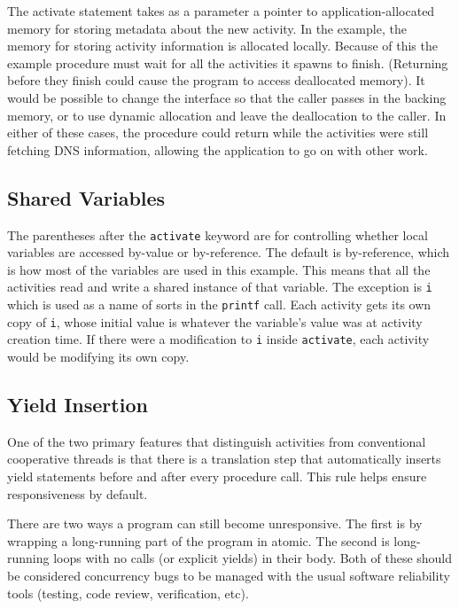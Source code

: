 \documentclass[sigplan,10pt,review,anonymous]{acmart}\settopmatter{printfolios=true,printccs=false,printacmref=false}
\begin{document}
The activate statement takes as a parameter a pointer to application-allocated memory for storing metadata about the new activity.
In the example, the memory for storing activity information is allocated locally.
Because of this the example procedure must wait for all the activities it spawns to finish.
(Returning before they finish could cause the program to access deallocated memory).
It would be possible to change the interface so that the caller passes in the backing memory, or to use dynamic allocation and leave the deallocation to the caller.
In either of these cases, the procedure could return while the activities were still fetching DNS information, allowing the application to go on with other work.

\subsection{Shared Variables}

The parentheses after the \texttt{activate} keyword are for controlling whether local variables are accessed by-value or by-reference.
The default is by-reference, which is how most of the variables are used in this example.
This means that all the activities read and write a shared instance of that variable.
The exception is \texttt{i} which is used as a name of sorts in the \texttt{printf} call.
Each activity gets its own copy of \texttt{i}, whose initial value is whatever the variable's value was at activity creation time.
If there were a modification to \texttt{i} inside \texttt{activate}, each activity would be modifying its own copy.

\subsection{Yield Insertion}

One of the two primary features that distinguish activities from conventional cooperative threads is that there is a translation step that automatically inserts yield statements before and after every procedure call.
This rule helps ensure responsiveness by default.

There are two ways a program can still become unresponsive.
The first is by wrapping a long-running part of the program in atomic.
The second is long-running loops with no calls (or explicit yields) in their body.
Both of these should be considered concurrency bugs to be managed with the usual software reliability tools (testing, code review, verification, etc).
\end{document}
